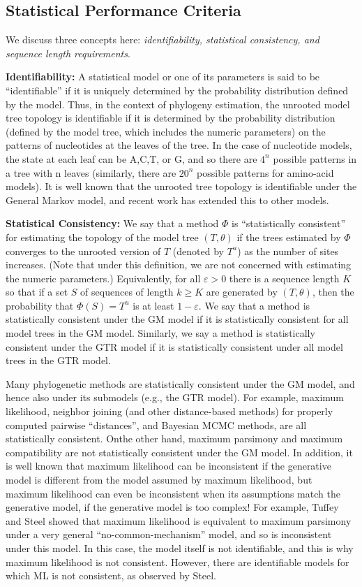 \subsection{Statistical Performance Criteria}
We discuss three concepts here: \textit{identifiability, statistical consistency, 
and sequence length requirements}.


\textbf{Identifiability:} A statistical model or one of its parameters is said to be 
``identifiable'' if it is uniquely determined by the probability distribution 
defined by the model. Thus, in the context of phylogeny estimation, the 
unrooted model tree topology is identifiable if it is determined by the 
probability distribution (defined by the model tree, which includes the 
numeric parameters) on the patterns of nucleotides at the leaves of the tree. 
In the case of nucleotide models, the state at each leaf can be A,C,T, or G, 
and so there are $4^n$ possible patterns in a tree with n leaves 
(similarly, there are $20^n$ possible patterns for amino-acid models). 
It is well known that the unrooted tree topology is identifiable under 
the General Markov model, and recent work has extended this to 
other models.

\textbf{Statistical Consistency:} We say that a method $\Phi$ is ``statistically consistent'' 
for estimating the topology of the model tree $(T,\theta )$ if the trees estimated 
by $\Phi$ converges to the unrooted version of $T$ (denoted by $T^u$) as the number 
of sites increases. (Note that under this definition, we are not concerned 
with estimating the numeric parameters.) Equivalently, for all $\varepsilon > 0$ there 
is a sequence length $K$ so that if a set $S$ of sequences of length $k \geq K$ are 
generated by $(T,\theta)$, then the probability that $\Phi(S) = T^u$ is at least $1-\varepsilon$. 
We say that a method is statistically consistent under the GM model if 
it is statistically consistent for all model trees in the GM model. 
Similarly, we say a method is statistically consistent under the GTR 
model if it is statistically consistent under all model trees in the GTR model. 

Many phylogenetic methods are statistically consistent under the GM model, 
and hence also under its submodels (e.g., the GTR model). For example, 
maximum likelihood, neighbor joining (and other distance-based methods) 
for properly computed pairwise ``distances'', and Bayesian MCMC methods, 
are all statistically consistent. Onthe other hand, maximum parsimony and 
maximum compatibility are not statistically consistent under the GM 
model. In addition, it is well known that maximum likelihood can be 
inconsistent if the generative model is different from the model 
assumed by maximum likelihood, but maximum likelihood can even be 
inconsistent when its assumptions match the generative model, 
if the generative model is too complex! For example, 
Tuffey and Steel showed that maximum likelihood is equivalent 
to maximum parsimony under a very general ``no-common-mechanism'' model, 
and so is inconsistent under this model. In this case, the model 
itself is not identifiable, and this is why maximum likelihood 
is not consistent. However, there are identifiable models for 
which ML is not consistent, as observed by Steel.

